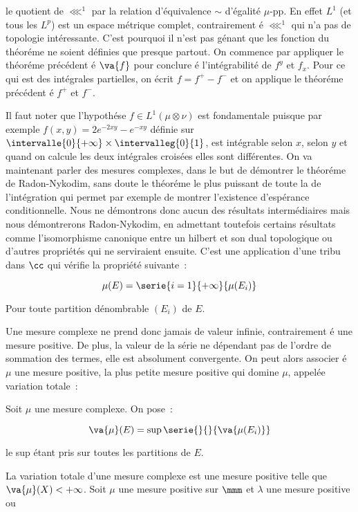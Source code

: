 le quotient de $\lll^1$ par la relation d'équivalence $\sim$ d'égalité $\mu$-pp. En effet $L^1$ (et tous les $L^p$) est un espace
métrique complet, contrairement é $\lll^1$ qui n'a pas de topologie intéressante. C'est pourquoi il n'est pas génant que les fonction
du théoréme ne soient définies que presque partout.
\dem On commence par appliquer le théoréme précédent é $\va{f}$ pour conclure é l'intégrabilité de $f^y$ et $f_x$. Pour ce qui est
des intégrales partielles, on écrit $f = f^+-f^-$ et on applique le théoréme précédent é $f^+$ et $f^-$.\par
Il faut noter que l'hypothése $f\in L^1(\mu\otimes\nu)$ est fondamentale puisque par exemple $f(x,y) = 2e^{-2xy}-e^{-xy}$ définie
sur $\intervalle{0}{+\infty}\times\intervalleg{0}{1}$, est intégrable selon $x$, selon $y$ et quand on calcule les deux intégrales 
croisées elles sont différentes.
On va maintenant parler des mesures complexes, dans le but de démontrer le théoréme de Radon-Nykodim, sans doute le théoréme
le plus puissant de toute la de l'intégration qui permet par exemple de montrer l'existence d'espérance conditionnelle. Nous ne 
démontrons donc aucun des résultats intermédiaires mais nous démontrerons Radon-Nykodim, en admettant toutefois certains résultats comme
l'isomorphisme canonique entre un hilbert et son dual topologique ou d'autres propriétés qui ne serviraient ensuite. 
 C'est une application d'une tribu dans $\cc$ qui vérifie la propriété suivante~:\par
$$\mu(E) = \serie{i=1}{+\infty}{\mu(E_i)}$$\par
Pour toute partition dénombrable $(E_i)$ de $E$.\par
\rmq Une mesure complexe ne prend donc jamais de valeur infinie, contrairement é une mesure positive. De plus, 
la valeur de la série ne dépendant pas de l'ordre de sommation des termes, elle est absolument convergente. On peut
alors associer é $\mu$ une mesure positive, la plus petite mesure positive qui domine $\mu$, appelée variation totale~:\par
{} Soit $\mu$ une mesure complexe. On pose~:\par
$$\va{\mu}(E) = \sup \serie{}{}{\va{\mu(E_i)}}$$\par
le sup étant pris sur toutes les partitions de $E$.\par
\prop{} La variation totale d'une mesure complexe est une mesure positive telle que $\va{\mu}(X)<+\infty$.
 Soit $\mu$ une mesure positive sur $\mmm$ et $\lambda$ une mesure positive ou 
